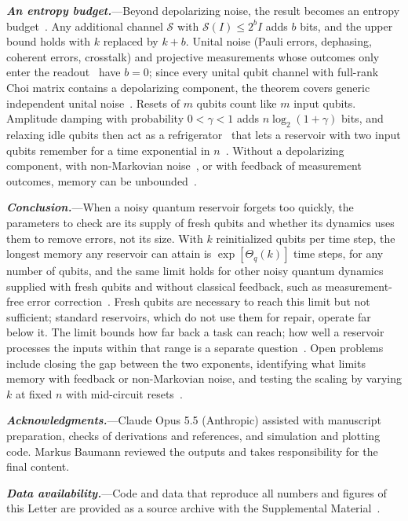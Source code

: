 \documentclass[aps,prl,twocolumn,superscriptaddress,floatfix]{revtex4-2}
\theoremstyle{plain}
\newcommand{\runin}[1]{\textit{\textbf{#1}}---}
\begin{document}
\runin{An entropy budget.}Beyond depolarizing noise, the result becomes an entropy budget~\cite{SM}. Any additional channel $\mathcal S$ with $\mathcal S(I)\le2^bI$ adds $b$ bits, and the upper bound holds with $k$ replaced by $k+b$. Unital noise (Pauli errors, dephasing, coherent errors, crosstalk) and projective measurements whose outcomes only enter the readout~\cite{Mujal2023} have $b=0$; since every unital qubit channel with full-rank Choi matrix contains a depolarizing component, the theorem covers generic independent unital noise~\cite{SM}. Resets of $m$ qubits count like $m$ input qubits. Amplitude damping with probability $0<\gamma<1$ adds $n\log_2(1+\gamma)$ bits, and relaxing idle qubits then act as a refrigerator~\cite{BenOr2013} that lets a reservoir with two input qubits remember for a time exponential in $n$~\cite{SM,Hoeffding1963}. Without a depolarizing component, with non-Markovian noise~\cite{Sannia2026}, or with feedback of measurement outcomes, memory can be unbounded~\cite{SM}.

\runin{Conclusion.}When a noisy quantum reservoir forgets too quickly, the parameters to check are its supply of fresh qubits and whether its dynamics uses them to remove errors, not its size. With $k$ reinitialized qubits per time step, the longest memory any reservoir can attain is $\exp[\Theta_q(k)]$ time steps, for any number of qubits, and the same limit holds for other noisy quantum dynamics supplied with fresh qubits and without classical feedback, such as measurement-free error correction~\cite{Heussen2024}. Fresh qubits are necessary to reach this limit but not sufficient; standard reservoirs, which do not use them for repair, operate far below it. The limit bounds how far back a task can reach; how well a reservoir processes the inputs within that range is a separate question~\cite{Cao2026}. Open problems include closing the gap between the two exponents, identifying what limits memory with feedback or non-Markovian noise, and testing the scaling by varying $k$ at fixed $n$ with mid-circuit resets~\cite{Yasuda2023,Hu2024}.

\begin{acknowledgments}
\runin{Acknowledgments.}Claude Opus 5.5 (Anthropic) assisted with manuscript preparation, checks of derivations and references, and simulation and plotting code. Markus Baumann reviewed the outputs and takes responsibility for the final content.
\end{acknowledgments}

\runin{Data availability.}Code and data that reproduce all numbers and figures of this Letter are provided as a source archive with the Supplemental Material~\cite{SM}.

\nocite{vonNeumann1956,Nelson2026,Xiong2025,Dao2026}

\end{document}
